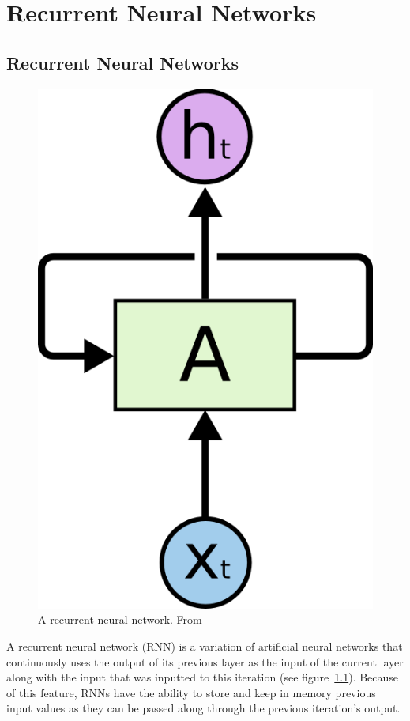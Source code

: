 \chapter{Recurrent Neural Networks}\label{ch:rnn}

\section{Recurrent Neural Networks}
\begin{figure}
	\begin{center}
		\includegraphics[scale=0.5]{rnn/rnn_rolled}
	\end{center}
	\caption{A recurrent neural network. From~\cite{olah2015understanding}\label{fig:rnn_img}}
\end{figure}

A recurrent neural network (RNN) is a variation of artificial neural networks that continuously uses the output of its previous layer as the input of the current layer along with the input that was inputted to this iteration (see figure~\ref{fig:rnn_img}). Because of this feature, RNNs have the ability to store and keep in memory previous input values as they can be passed along through the previous iteration's output. 

